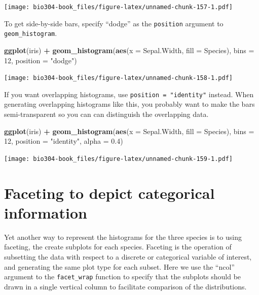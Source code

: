 \documentclass[]{book}
\newenvironment{Shaded}{\begin{snugshade}}{\end{snugshade}}
\newcommand{\DataTypeTok}[1]{\textcolor[rgb]{0.13,0.29,0.53}{#1}}
\newcommand{\DecValTok}[1]{\textcolor[rgb]{0.00,0.00,0.81}{#1}}
\newcommand{\FloatTok}[1]{\textcolor[rgb]{0.00,0.00,0.81}{#1}}
\newcommand{\KeywordTok}[1]{\textcolor[rgb]{0.13,0.29,0.53}{\textbf{#1}}}
\newcommand{\NormalTok}[1]{#1}
\newcommand{\OperatorTok}[1]{\textcolor[rgb]{0.81,0.36,0.00}{\textbf{#1}}}
\newcommand{\StringTok}[1]{\textcolor[rgb]{0.31,0.60,0.02}{#1}}
\theoremstyle{definition}
\theoremstyle{definition}
\theoremstyle{definition}
\theoremstyle{remark}
\begin{document}
\texttt{[image: bio304-book\_files/figure-latex/unnamed-chunk-157-1.pdf]}

To get side-by-side bars, specify ``dodge'' as the \texttt{position}
argument to \texttt{geom\_histogram}.

\begin{Shaded}
\begin{Highlighting}[]
\KeywordTok{ggplot}\NormalTok{(iris) }\OperatorTok{+}\StringTok{ }
\StringTok{  }\KeywordTok{geom_histogram}\NormalTok{(}\KeywordTok{aes}\NormalTok{(}\DataTypeTok{x =}\NormalTok{ Sepal.Width, }\DataTypeTok{fill =}\NormalTok{ Species),}
                 \DataTypeTok{bins =} \DecValTok{12}\NormalTok{, }\DataTypeTok{position =} \StringTok{"dodge"}\NormalTok{)}
\end{Highlighting}
\end{Shaded}

\texttt{[image: bio304-book\_files/figure-latex/unnamed-chunk-158-1.pdf]}

If you want overlapping histograms, use \texttt{position\ =\ "identity"}
instead. When generating overlapping histograms like this, you probably
want to make the bars semi-transparent so you can can distinguish the
overlapping data.

\begin{Shaded}
\begin{Highlighting}[]
\KeywordTok{ggplot}\NormalTok{(iris) }\OperatorTok{+}\StringTok{ }
\StringTok{  }\KeywordTok{geom_histogram}\NormalTok{(}\KeywordTok{aes}\NormalTok{(}\DataTypeTok{x =}\NormalTok{ Sepal.Width, }\DataTypeTok{fill =}\NormalTok{ Species), }
                 \DataTypeTok{bins =} \DecValTok{12}\NormalTok{, }\DataTypeTok{position =} \StringTok{"identity"}\NormalTok{, }\DataTypeTok{alpha =} \FloatTok{0.4}\NormalTok{)}
\end{Highlighting}
\end{Shaded}

\texttt{[image: bio304-book\_files/figure-latex/unnamed-chunk-159-1.pdf]}

\hypertarget{faceting-to-depict-categorical-information}{%
\section{Faceting to depict categorical
information}\label{faceting-to-depict-categorical-information}}

Yet another way to represent the histograms for the three species is to
using faceting, the create subplots for each species. Faceting is the
operation of subsetting the data with respect to a discrete or
categorical variable of interest, and generating the same plot type for
each subset. Here we use the ``ncol'' argument to the
\texttt{facet\_wrap} function to specify that the subplots should be
drawn in a single vertical column to facilitate comparison of the
distributions.
\end{document}
